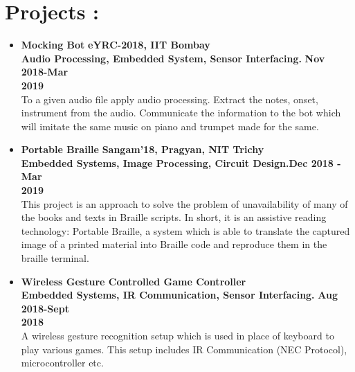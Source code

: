 \documentclass[a4paper, 12 pt]{article}
\begin{document}
\section*{Projects :}
\begin{itemize}
\item {\Large \textbf{Mocking Bot}}{ \hfill {\bf eYRC-2018, IIT Bombay}}\\
{\bf Audio Processing, Embedded System, Sensor Interfacing.} \hfill{\bf Nov 2018-Mar} \\ \hfill {\bf 2019}\\
To a given audio file apply audio processing. Extract the notes, onset, instrument from the audio. Communicate the information to the bot which will imitate the same music on piano and trumpet made for the same.
\item {\Large \textbf{Portable Braille}}{ \hfill {\bf Sangam'18, Pragyan, NIT Trichy}}\\
{\bf Embedded Systems, Image Processing, Circuit Design.}\hfill{\bf Dec 2018 - Mar} \\ \hfill {\bf 2019}\\
This project is an approach to solve the problem of unavailability of many of the books and texts in Braille scripts. In short, it is an assistive reading technology: Portable Braille, a system which is able to translate the captured image of a printed material into Braille code and reproduce them in the braille terminal.\\
\item {\Large \textbf{Wireless Gesture Controlled Game Controller }}\\
{\bf Embedded Systems, IR Communication, Sensor Interfacing.} \hfill {\bf Aug 2018-Sept}\\ \hfill {\bf 2018}\\
A wireless gesture recognition setup which is used in place of keyboard to play various games. This setup includes IR Communication (NEC Protocol), microcontroller etc.
\end{itemize}
\end{document}
